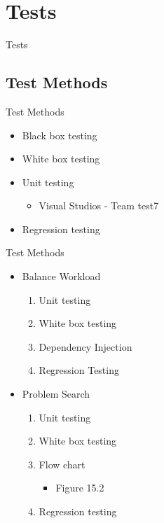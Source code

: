\section{Tests}
\begin{frame}{}
\begin{center}
\huge
Tests
\end{center}
\end{frame}
\subsection{Test Methods}
\begin{frame}{Test Methods}
	\begin{itemize}
		\item Black box testing
		\item White box testing
		\item Unit testing
		\begin{itemize}
				\item Visual Studios - Team test7
		\end{itemize}
		\item Regression testing
	\end{itemize}
\end{frame}

\begin{frame}{Test Methods}
	\begin{itemize}
		\item Balance Workload
			\begin{enumerate}
				\item Unit testing
				\item White box testing
				\item Dependency Injection
				\item Regression Testing
			\end{enumerate}
		\item Problem Search
		\begin{enumerate}
				\item Unit testing
				\item White box testing
			\item Flow chart
			\begin{itemize}
			\item Figure 15.2
			\end{itemize}
			\item Regression testing
		\end{enumerate}
	\end{itemize}
\end{frame}